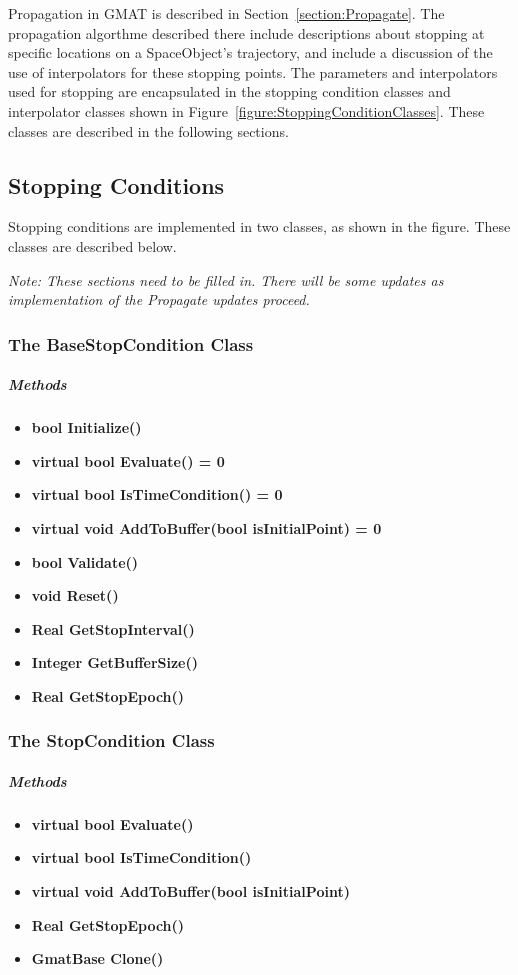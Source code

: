 Propagation in GMAT is described in Section~\ref{section:Propagate}.  The propagation algorthme
described there include descriptions about stopping at specific locations on a SpaceObject's
trajectory, and include a discussion of the use of interpolators for these stopping points.  The
parameters and interpolators used for stopping are encapsulated in the stopping condition classes
and interpolator classes shown in Figure~\ref{figure:StoppingConditionClasses}.  These classes are
described in the following sections.

\subsection{Stopping Conditions}

Stopping conditions are implemented in two classes, as shown in the figure.  These classes are
described below.

\textit{Note: These sections need to be filled in.  There will be some updates as implementation
of the Propagate updates proceed.}

\subsubsection{The BaseStopCondition Class}

\subparagraph{Methods}
\begin{itemize}
\item \textbf{bool Initialize()}
\item \textbf{virtual bool Evaluate() = 0}
\item \textbf{virtual bool IsTimeCondition() = 0}
\item \textbf{virtual void AddToBuffer(bool isInitialPoint) = 0}
\item \textbf{bool Validate()}
\item \textbf{void Reset()}
\item \textbf{Real GetStopInterval()}
\item \textbf{Integer GetBufferSize()}
\item \textbf{Real GetStopEpoch()}
\end{itemize}

\subsubsection{The StopCondition Class}

\subparagraph{Methods}
\begin{itemize}
\item \textbf{virtual bool Evaluate()}
\item \textbf{virtual bool IsTimeCondition()}
\item \textbf{virtual void AddToBuffer(bool isInitialPoint)}
\item \textbf{Real GetStopEpoch()}
\item \textbf{GmatBase Clone()}
\end{itemize}

